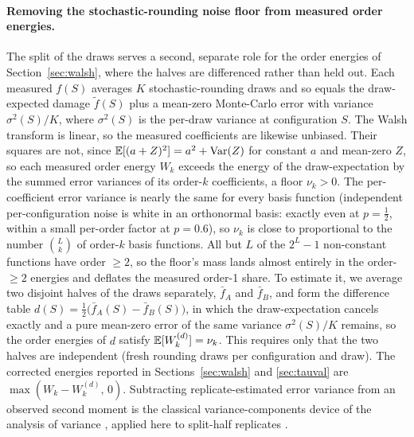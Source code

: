 \paragraph{Removing the stochastic-rounding noise floor from measured order energies.} The split of the
draws serves a second, separate role for the order energies of Section~\ref{sec:walsh}, where the halves are
differenced rather than held out. Each measured
$f(S)$ averages $K$ stochastic-rounding draws and so equals the draw-expected damage $\tilde f(S)$
plus a mean-zero
Monte-Carlo error with variance $\sigma^2(S)/K$, where $\sigma^2(S)$ is the per-draw variance at
configuration $S$. The Walsh transform is linear, so the measured coefficients are likewise unbiased.
Their squares are not, since
$\mathbb{E}[(a+Z)^2] = a^2 + \operatorname{Var}(Z)$ for constant $a$ and mean-zero $Z$, so each measured order energy $W_k$
exceeds the energy of the draw-expectation by the summed error variances of its order-$k$ coefficients,
a floor
$\nu_k > 0$. The per-coefficient error variance is nearly the same for every basis function
(independent per-configuration noise is white in an orthonormal basis: exactly even at $p=\tfrac12$,
within a small per-order factor at $p=0.6$), so $\nu_k$ is close to proportional to the number
$\binom{L}{k}$ of order-$k$ basis functions. All but $L$ of the $2^L-1$ non-constant functions have
order $\ge 2$, so the floor's mass lands almost entirely in the order-$\ge 2$ energies and deflates the
measured order-1 share. To estimate it, we average two disjoint halves of the draws
separately, $\bar f_A$ and $\bar f_B$, and form the difference table
$d(S)=\tfrac12\bigl(\bar f_A(S)-\bar f_B(S)\bigr)$, in which the draw-expectation cancels exactly and a
pure mean-zero error of the same variance $\sigma^2(S)/K$ remains, so the order energies of $d$ satisfy
$\mathbb{E}[W^{(d)}_k]=\nu_k$. This requires only that the two halves are independent (fresh rounding draws per
configuration and draw). The corrected
energies reported in Sections~\ref{sec:walsh} and \ref{sec:tauval} are
$\max(W_k - W^{(d)}_k,\,0)$. Subtracting replicate-estimated error variance from an observed second
moment is the classical variance-components device of the analysis of variance
\citep[Ch.~7]{scheffe1959anova}, applied here to split-half replicates
\citep{spearman1910correlation,brown1910some}.

